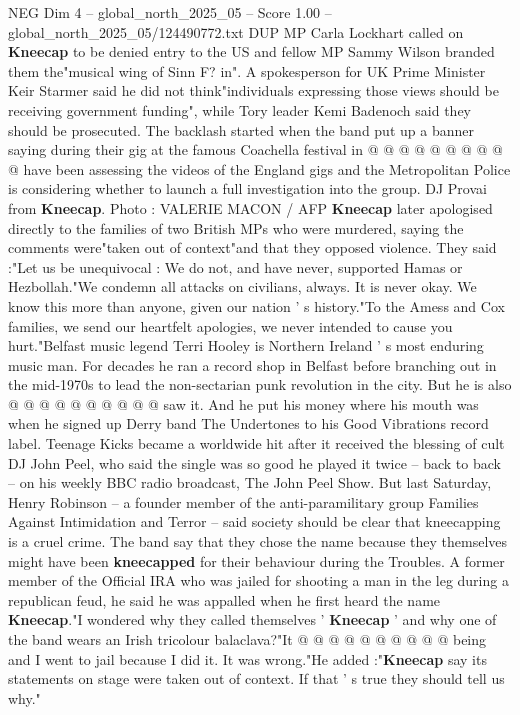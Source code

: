 \begin{textsample}{NEG Dim 4 – global\_north\_2025\_05 – Score 1.00 – global\_north\_2025\_05/124490772.txt}
DUP MP Carla Lockhart called on \textbf{Kneecap} to be denied entry to the US and fellow MP Sammy Wilson branded them the"musical wing of Sinn F? in".
A spokesperson for UK Prime Minister Keir Starmer said he did not think"individuals expressing those views should be receiving government funding", while Tory leader Kemi Badenoch said they should be prosecuted.
The backlash started when the band put up a banner saying during their gig at the famous Coachella festival in @ @ @ @ @ @ @ @ @ @ have been assessing the videos of the England gigs and the Metropolitan Police is considering whether to launch a full investigation into the group.
DJ Provai from \textbf{Kneecap}.
Photo : VALERIE MACON / AFP \textbf{Kneecap} later apologised directly to the families of two British MPs who were murdered, saying the comments were"taken out of context"and that they opposed violence.
They said :"Let us be unequivocal : We do not, and have never, supported Hamas or Hezbollah."We condemn all attacks on civilians, always.
It is never okay.
We know this more than anyone, given our nation ' s history."To the Amess and Cox families, we send our heartfelt apologies, we never intended to cause you hurt."Belfast music legend Terri Hooley is Northern Ireland ' s most enduring music man.
For decades he ran a record shop in Belfast before branching out in the mid-1970s to lead the non-sectarian punk revolution in the city.
But he is also @ @ @ @ @ @ @ @ @ @ saw it.
And he put his money where his mouth was when he signed up Derry band The Undertones to his Good Vibrations record label.
Teenage Kicks became a worldwide hit after it received the blessing of cult DJ John Peel, who said the single was so good he played it twice -- back to back -- on his weekly BBC radio broadcast, The John Peel Show.
But last Saturday, Henry Robinson -- a founder member of the anti-paramilitary group Families Against Intimidation and Terror -- said society should be clear that kneecapping is a cruel crime.
The band say that they chose the name because they themselves might have been \textbf{kneecapped} for their behaviour during the Troubles.
A former member of the Official IRA who was jailed for shooting a man in the leg during a republican feud, he said he was appalled when he first heard the name \textbf{Kneecap}."I wondered why they called themselves ' \textbf{Kneecap} ' and why one of the band wears an Irish tricolour balaclava?"It @ @ @ @ @ @ @ @ @ @ being and I went to jail because I did it.
It was wrong."He added :"\textbf{Kneecap} say its statements on stage were taken out of context.
If that ' s true they should tell us why."

\end{textsample}
